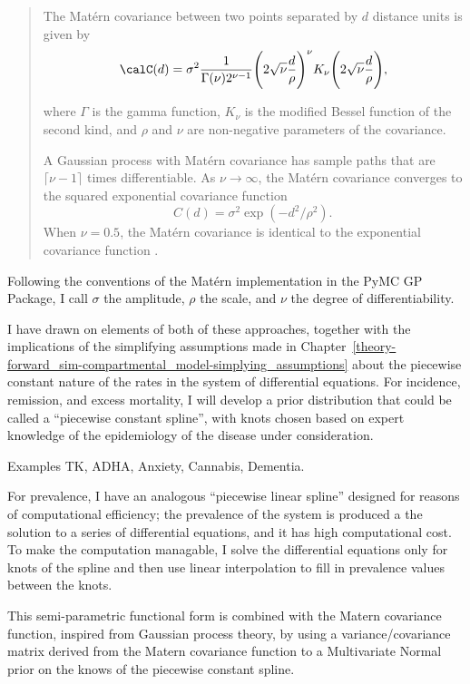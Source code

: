 \begin{quote}
The Mat\'{e}rn covariance between two points separated by $d$ distance
units is given by
\[
\calC(d) =
\sigma^2\frac{1}{\Gamma(\nu)2^{\nu-1}}\Bigg(2\sqrt{\nu}\frac{d}{\rho}\Bigg)^\nu
K_\nu\Bigg(2\sqrt{\nu}\frac{d}{\rho}\Bigg),
\]

where $\Gamma$ is the gamma function, $K_\nu$ is the modified Bessel
function of the second kind, and $\rho$ and $\nu$ are non-negative
parameters of the covariance.

A Gaussian process with Mat\'{e}rn covariance has sample paths that are
$\lceil \nu-1 \rceil$ times differentiable. As $\nu\rightarrow\infty$,
the Mat\'{e}rn covariance converges to the squared exponential covariance
function
\[
C(d) = \sigma^2\exp(-d^2/\rho^2). \,
\]
When $\nu = 0.5$, the Mat\'{e}rn covariance is identical to the
exponential covariance function \cite{WP:Matern}.
\end{quote}

Following the conventions of the Mat\'{e}rn implementation in the PyMC GP
Package, I call $\sigma$ the amplitude, $\rho$ the scale, and $\nu$
the degree of differentiability.

I have drawn on elements of both of these approaches, together with
the implications of the simplifying assumptions made in
Chapter~\ref{theory-forward_sim-compartmental_model-simplying_assumptions}
about the piecewise constant nature of the rates in the system of
differential equations.  For incidence, remission, and excess
mortality, I will develop a prior distribution that could be called a
``piecewise constant spline'', with knots chosen based on expert
knowledge of the epidemiology of the disease under consideration.

Examples TK, ADHA, Anxiety, Cannabis, Dementia.

For prevalence, I have an analogous ``piecewise linear spline''
designed for reasons of computational efficiency; the prevalence of
the system is produced a the solution to a series of differential
equations, and it has high computational cost.  To make the
computation managable, I solve the differential equations only for
knots of the spline and then use linear interpolation to fill in
prevalence values between the knots.

This semi-parametric functional form is combined with the Matern
covariance function, inspired from Gaussian process theory, by using a
variance/covariance matrix derived from the Matern covariance function
to a Multivariate Normal prior on the knows of the piecewise constant
spline.

